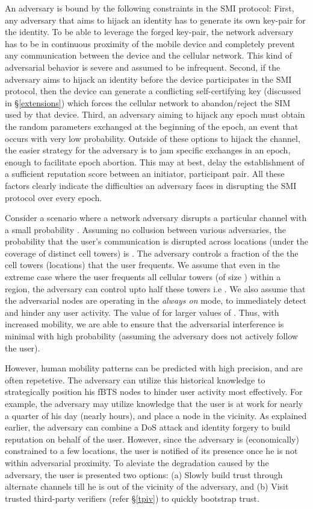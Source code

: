 \documentclass[letterpaper,twocolumn]{sig-alternate}
\begin{document}
An adversary is bound by the following constraints in the SMI protocol: First, any adversary that aims to hijack an identity has to generate its own key-pair for the identity. To be able to leverage the forged key-pair, the network adversary has to be in continuous proximity of the mobile device and completely prevent any communication between the device and the cellular network. This kind of adversarial behavior is severe and assumed to be infrequent. Second, if the adversary aims to hijack an identity before the device participates in the SMI protocol, then the device can generate a conflicting self-certifying key (discussed in \S \ref{extensions}) which forces the cellular network to abandon/reject the SIM used by that device. Third, an adversary aiming to hijack any epoch must obtain the random parameters exchanged at the beginning of the epoch, an event that occurs with very low probability. Outside of these options to hijack the channel, the easier strategy for the adversary is to jam specific exchanges in an epoch, enough to facilitate epoch abortion. This may at best, delay the establishment of a sufficient reputation score between an initiator, participant pair. All these factors clearly indicate the difficulties an adversary faces in disrupting the SMI protocol over every epoch. 

\vspace{1mm}
Consider a scenario where a network adversary disrupts a particular channel with a small probability . Assuming no collusion between various adversaries, the probability that the user's communication is disrupted across  locations (under the coverage of distinct cell towers) is . The adversary controls a fraction of the the cell towers (locations) that the user frequents. We assume that even in the extreme case where the user frequents all cellular towers (of size ) within a region, the adversary can control upto half these towers i.e . We also assume that the adversarial nodes are operating in the {\em always on} mode, to immediately detect and hinder any user activity. The value of  for larger values of . Thus, with increased mobility, we are able to ensure that the adversarial interference is minimal with high probability (assuming the adversary does not actively follow the user). 

\vspace{1mm}
However, human mobility patterns can be predicted with high precision, and are often repetetive. The adversary can utilize this historical knowledge to strategically position his fBTS nodes to hinder user activity most effectively. For example, the adversary may utilize knowledge that the user is at work for nearly a quarter of his day (nearly  hours), and place a node in the vicinity. As explained earlier, the adversary can combine a DoS attack and identity forgery to build reputation on behalf of the user. However, since the adversary is (economically) constrained to a few locations, the user is notified of its presence once he is not within adversarial proximity. To aleviate the degradation caused by the adversary, the user is presented two options: (a) Slowly build trust through alternate channels till he is out of the vicinity of the adversary, and (b) Visit trusted third-party verifiers (refer \S \ref{tpiv}) to quickly bootstrap trust. 
\end{document}
